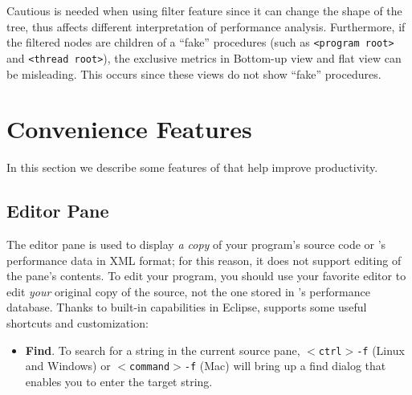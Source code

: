 Cautious is needed when using filter feature since it can change the shape of the tree, thus affects different interpretation of performance analysis.
Furthermore, if the filtered nodes are children of a ``fake'' procedures (such as \texttt{<program root>} and \texttt{<thread root>}), the exclusive metrics in Bottom-up view and flat view can be misleading. 
This occurs since these views do not show ``fake'' procedures.



\section{Convenience Features}

In this section we describe some features of \hpcviewer{} that help improve productivity.


\subsection{Editor Pane}

The editor pane is used to display \textit{a copy} of your program's source code or \HPCToolkit{}'s performance data in XML format; for this reason, it does not support editing of the pane's contents.
To edit your program, you should use your favorite editor to edit \textit{your} original copy of the source, not the one stored in \HPCToolkit{}'s performance database.
Thanks to built-in capabilities in Eclipse, \hpcviewer{} supports some useful shortcuts and customization:
\begin{itemize}

\item \textbf{Find}.
  To search for a string in the current source pane, \texttt{$<$ctrl$>$-f} (Linux and Windows) or \texttt{$<$command$>$-f} (Mac) will bring up a find dialog that enables you to enter the target string.

\end{itemize}



